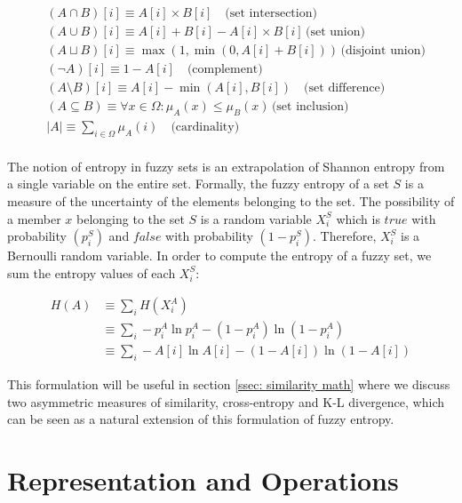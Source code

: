 \documentclass[11pt]{book}
\newcommand{\card}[1]{\left| #1 \right|}
\begin{document}
{\footnotesize \begin{align*} &(A \cap B)[i] \equiv  A[i] \times B[i] \quad
\text{(set intersection)} \\ &(A \cup B)[i] \equiv  A[i] + B[i]  - A[i] \times
B[i] \, \text{(set union)}\\ &(A \sqcup B)[i] \equiv  \max(1, \min(0, A[i] +
B[i])) \, \text{(disjoint union)}\\ &(\lnot A)[i] \equiv 1 - A[i] \quad
\text{(complement)}\\ &(A \setminus B)[i] \equiv A[i]  - \min(A[i], B[i]) \quad
\text{(set difference)} \\ &(A \subseteq B) \equiv \forall x \in \Omega:
\mu_A(x) \leq \mu_B(x) \, \text{(set inclusion)}\\ &\card A \equiv \sum_{i \in
\Omega} \mu_A (i) \quad \text{(cardinality)} \\
\end{align*} }

The notion of entropy in fuzzy sets is an extrapolation of Shannon entropy from
a single variable on the entire set. Formally, the fuzzy entropy of a set $S$
is a measure of the uncertainty of the elements belonging to the set. The
possibility of a member $x$ belonging to the set $S$ is a random variable
$X_i^S$ which is $true$ with probability $(p_i^S)$ and $false$ with probability
$(1-p^S_i)$. Therefore, $X_i^S$ is a Bernoulli random variable. In order to
compute the entropy of a fuzzy set, we sum the entropy values of each $X_i^S$:

{\footnotesize \begin{align*} H(A) &\equiv \sum_i H(X^A_i) \\ &\equiv \sum_i
-p_i^A \ln p_i^A - (1 - p_i^A) \ln (1 - p_i^A) \\ &\equiv  \sum_i -A[i] \ln
A[i] - (1 - A[i]) \ln (1 - A[i]) \end{align*} }

This formulation will be useful in section \ref{ssec: similarity math} where we
discuss two asymmetric measures of similarity, cross-entropy and K-L
divergence, which can be seen as a natural extension of this formulation of
fuzzy entropy.

\section{Representation and Operations} \label{sec: meat of the paper}
\end{document}
